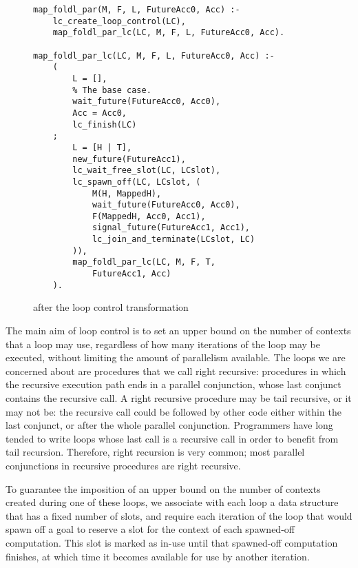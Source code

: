 
\begin{figure}[tb]
\begin{verbatim}
map_foldl_par(M, F, L, FutureAcc0, Acc) :-
    lc_create_loop_control(LC),
    map_foldl_par_lc(LC, M, F, L, FutureAcc0, Acc).

map_foldl_par_lc(LC, M, F, L, FutureAcc0, Acc) :-
    (
        L = [],
        % The base case.
        wait_future(FutureAcc0, Acc0),
        Acc = Acc0,
        lc_finish(LC)
    ;
        L = [H | T],
        new_future(FutureAcc1),
        lc_wait_free_slot(LC, LCslot),
        lc_spawn_off(LC, LCslot, (
            M(H, MappedH),
            wait_future(FutureAcc0, Acc0),
            F(MappedH, Acc0, Acc1),
            signal_future(FutureAcc1, Acc1),
            lc_join_and_terminate(LCslot, LC)
        )),
        map_foldl_par_lc(LC, M, F, T,
            FutureAcc1, Acc)
    ).
\end{verbatim}
\caption{\mapfoldlpar after the loop control transformation}
\label{fig:map_foldl_transformed}
\end{figure}

The main aim of loop control is to set an upper bound
on the number of contexts that a loop may use,
regardless of how many iterations of the loop may be executed,
without limiting the amount of parallelism available.
The loops we are concerned about
are procedures that we call right recursive:
procedures in which the recursive execution path
ends in a parallel conjunction,
whose last conjunct contains the recursive call.
A right recursive procedure may be tail recursive, or it may not be:
the recursive call could be followed by other code
either within the last conjunct, or after the whole parallel conjunction.
Programmers have long tended to write loops whose last call is a recursive
call in order to benefit from tail recursion.
Therefore,
right recursion is very common;
most parallel conjunctions in recursive procedures are right recursive.

To guarantee the imposition of an upper bound
on the number of contexts created during one of these loops,
we associate with each loop a data structure
that has a fixed number of slots,
and require each iteration of the loop that would spawn off a goal
to reserve a slot for the context of each spawned-off computation.
This slot is marked as in-use until that spawned-off computation finishes,
at which time it becomes available for use by another iteration.

